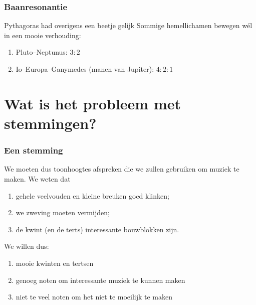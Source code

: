\documentclass[compress, darktitle, framenumber, totalframenumber, handout]{beamer}
\newenvironment{danger}{\noindent\hangindent=2pc\hangafter=-2%
  \clubpenalty=10000%
  \hbox to0pt{\hskip-\hangindent\dbend\hfill}\small\ignorespaces}%
  {\medbreak\par}
\begin{document}
\begin{frame}
  \frametitle{Baanresonantie}

  \begin{block}{Pythagoras had overigens een beetje gelijk}
    Sommige hemellichamen bewegen w\'el in een mooie verhouding:
    \begin{enumerate}
      \item Pluto--Neptunus: $3:2$
      \item Io--Europa--Ganymedes (manen van Jupiter): $4:2:1$
    \end{enumerate}
  \end{block}

  \pause

\end{frame}

\section{Wat is het probleem met stemmingen?}

\begin{frame}[label=tunings]
  \frametitle{Een stemming}

  We moeten dus toonhoogtes afspreken die we zullen gebruiken om muziek te maken. We weten dat
  \begin{enumerate}
    \item gehele veelvouden en kleine breuken goed klinken;
    \item we zweving moeten vermijden;
    \item de kwint (en de terts) interessante bouwblokken zijn.
  \end{enumerate}
  \pause
  We willen dus:
  \begin{enumerate}
    \item mooie kwinten en tertsen
    \item genoeg noten om interessante muziek te kunnen maken
    \item niet te veel noten om het niet te moeilijk te maken
  \end{enumerate}
\end{frame}
\end{document}
